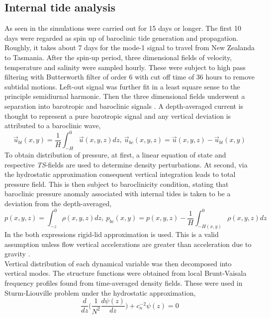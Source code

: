 \documentclass[12pt]{article}
\begin{document}
\subsection{Internal tide analysis}
As seen in  the simulations were carried out for 15 days or longer. The 
first 10 days were regarded as spin up of baroclinic tide generation and propagation. Roughly, it 
takes about 7 days for the mode-1 signal to travel from New Zealanda to Tasmania. After the spin-up 
period, three 
dimensional fields of velocity, temperature and salinity were sampled hourly. These 
were subject to high pass filtering with Butterworth filter of order $6$ with cut off time of $36$ 
hours to remove subtidal motions. Left-out signal was further fit in a least square sense to the 
principle semidiurnal harmonic. Then the three dimensional fields 
underwent a separation into barotropic and baroclinic signals \citep{cummins1997simulation, 
kunze2002internal, carter2008energetics}. A depth-averaged current is thought to represent a pure 
barotropic signal and any vertical deviation is attributed to a baroclinic wave,
\begin{equation}
\label{ch2:bt_bc_vel}
\vec{u}_{bt}(x,y) = \frac{1}{H} \int_{-H}^{0} \vec{u}(x,y,z)  dz,~\vec{u}_{bc}(x,y,z) =  
\vec{u}(x,y,z) - \vec{u}_{bt}(x,y)
\end{equation}
To obtain distribution of pressure, at first, a linear equation of state and respective 
\textit{TS}-fields are used to determine density perturbations. At second, via the hydrostatic 
approximation consequent vertical integration leads to total pressure field. This 
is then subject to baroclinicity condition, stating that baroclinic pressure anomaly associated 
with internal tides is taken to be a deviation from the depth-averaged,
\begin{equation}
\label{ch2:bt_bc_pres}
p(x,y,z) = \int_{-z}^{0} \rho(x,y,z) dz,~p_{bc}(x,y) = p(x,y,z) - \frac{1}{H} \int_{-H(x,y)}^{0} 
\rho(x,y,z) dz
\end{equation}
In the both expressions rigid-lid approximation is used. This is a valid assumption unless flow 
vertical accelerations are greater than acceleration due to gravity \citep{kelly2010}.\\
Vertical distribution of each dynamical variable was then decomposed into vertical modes. The 
structure functions were 
obtained from local Brunt-Vaisala frequency profiles found from time-averaged density fields. 
These were used in Sturm-Liouville problem under the hydrostatic approximation,
\begin{equation}
\frac{d}{dz}\Big( \frac{1}{N^2}  \frac{d \psi(z)}{dz}\Big) + c^{-2}_n \psi(z) 
= 0
\end{equation}
\end{document}
